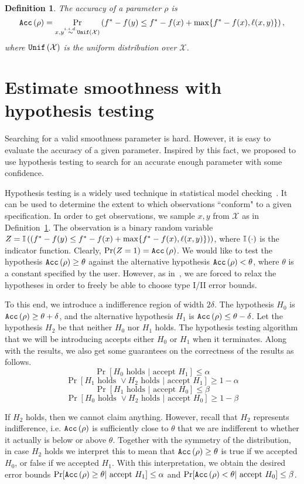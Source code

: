 \documentclass[12pt]{article}
\newtheorem{definition}{Definition}
\newcommand{\X}{\mathcal{X}}
\begin{document}
\begin{definition}
\label{def:acc}
The accuracy of a parameter $\rho$ is
\[
\Acc{\rho} = \Pr_{x, y \stackrel{i.i.d.}{\sim} \Unif{\X}} \left(f^* - f(y) \leq f^* - f(x) + \max\{f^* - f(x), \ell(x,y)\}\right),
\]
where $\Unif{\X}$ is the uniform distribution over $\X$.
\end{definition}

\section{Estimate smoothness with hypothesis testing}
Searching for a valid smoothness parameter is hard. However, it is easy to evaluate the accuracy of a given parameter. Inspired by this fact, we proposed to use hypothesis testing to search for an accurate enough parameter with some confidence.

Hypothesis testing is a widely used technique in statistical model checking~\cite{agha2018survey}. It can be used to determine the extent to which observations ``conform" to a given specification. In order to get observations, we sample $x, y$ from $\X$ as in Definition~\ref{def:acc}. The observation is a binary random variable $Z = \mathbb{I}\left(\left(f^* - f(y) \leq f^* - f(x) + \max\{f^* - f(x), \ell(x,y)\}\right)\right)$, where $\mathbb{I}\left(\cdot\right)$ is the indicator function. Clearly, $\Pr(Z=1) = \texttt{Acc}\left(\rho\right)$. We would like to test the hypothesis $\texttt{Acc}\left(\rho\right) \geq \theta$ against the alternative hypothesis $\texttt{Acc}\left(\rho\right) < \theta$, where $\theta$ is a constant specified by the user. However, as in~\cite{younes2002probabilistic}, we are forced to relax the hypotheses in order to freely be able to choose type I/II error bounds.

To this end, we introduce a indifference region of width $2\delta$. The hypothesis $H_0$ is $\texttt{Acc}\left(\rho\right) \geq \theta+\delta$, and the alternative hypothesis $H_1$ is $\texttt{Acc}\left(\rho\right) \leq \theta-\delta$. Let the hypothesis $H_2$ be that neither $H_0$ nor $H_1$ holds. The hypothesis testing algorithm that we will be introducing accepts either $H_0$ or $H_1$ when it terminates. Along with the results, we also get some guarantees on the correctness of the results as follows.
$$\Pr[H_0\text{ holds }|\text{ accept }H_1] \leq \alpha$$
$$\Pr[H_1\text{ holds }\vee H_2\text{ holds }|\text{ accept }H_1] \geq 1 - \alpha$$
$$\Pr[H_1\text{ holds }|\text{ accept }H_0] \leq \beta$$
$$\Pr[H_0\text{ holds }\vee H_2\text{ holds }|\text{ accept }H_0] \geq 1 - \beta$$

If $H_2$ holds, then we cannot claim anything. However, recall that $H_2$ represents indifference, i.e. $\texttt{Acc}\left(\rho\right)$ is sufficiently close to $\theta$ that we are indifferent to whether it actually is below or above $\theta$. Together with the symmetry of the distribution, in case $H_2$ holds we interpret this to mean that $\texttt{Acc}\left(\rho\right) \geq \theta$ is true if we accepted $H_0$, or false if we accepted $H_1$. With this interpretation, we obtain the desired error bounds $\Pr[\texttt{Acc}\left(\rho\right) \geq \theta |\text{ accept }H_1] \leq \alpha$ and $\Pr[\texttt{Acc}\left(\rho\right) < \theta |\text{ accept }H_0] \leq \beta$.
\end{document}
